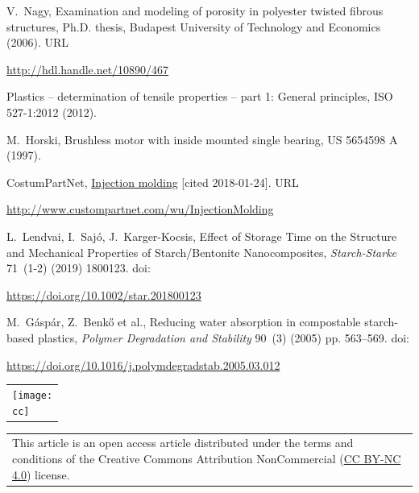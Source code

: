 \documentclass[10pt,a5paper]{article}
\begin{document}
\begin{thebibliography}{1}
V.~Nagy, Examination and modeling of porosity in polyester twisted fibrous
  structures, Ph.D. thesis, Budapest University of Technology and Economics
  (2006).
	\newline URL \begin{footnotesize}\url{http://hdl.handle.net/10890/467}\end{footnotesize}

Plastics -- determination of tensile properties -- part 1: General principles,
  {ISO 527-1:2012} (2012).

M.~Horski, Brushless motor with inside mounted single bearing, {US 5654598 A}
  (1997).

CostumPartNet,
  \href{http://www.custompartnet.com/wu/InjectionMolding}{Injection molding}
  [cited 2018-01-24].
\newline URL \begin{footnotesize}\url{http://www.custompartnet.com/wu/InjectionMolding}\end{footnotesize}

L.~Lendvai, I.~Sajó, J.~Karger-Kocsis, Effect of Storage Time on the Structure and Mechanical Properties of Starch/Bentonite Nanocomposites,  \textit{Starch-Starke} 71~(1-2) (2019) 1800123.
\newline doi: \begin{footnotesize}\url{https://doi.org/10.1002/star.201800123}\end{footnotesize}
	
M.~Gáspár, Z.~Benkő et al., Reducing water absorption in compostable starch-based plastics, 
 \textit{Polymer Degradation and Stability} 90~(3) (2005) pp. 563--569.
\newline doi: \begin{footnotesize}\url{https://doi.org/10.1016/j.polymdegradstab.2005.03.012}\end{footnotesize}

\end{thebibliography}

\begin{table}[ht]
\begin{minipage}{.15\textwidth}
    \begin{tabular}{*{1}{p{}}}
\texttt{[image: \\cc]}
\\
\end{tabular}
\end{minipage}%
\begin{minipage}{.9\textwidth}
    \begin{tabular}{*{1}{p{}}}
\footnotesize 
This article is an open access article distributed under the terms and conditions of the Creative Commons Attribution NonCommercial (\href{https://creativecommons.org/licenses/by-nc/4.0/}{CC BY-NC 4.0}) license. \\
\end{tabular}
\end{minipage}%
\end{table}
\end{document}
